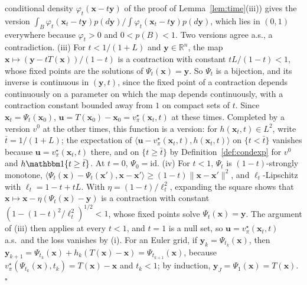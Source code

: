 \documentclass{article}
\newcommand{\RR}{\mathbb{R}}
\newcommand{\bx}{\mathbf{x}}
\newcommand{\by}{\mathbf{y}}
\newcommand{\bu}{\mathbf{u}}
\newcommand{\vstar}{v^{\star}}
\theoremstyle{plain}
\theoremstyle{remark}
\begin{document}
conditional density $\varphi_t(\bx-t\by)$ of the proof of Lemma~\ref{lem:time}(iii)) gives the version
$\int_B\varphi_t(\bx_t-t\by)p(d\by)/\int\varphi_t(\bx_t-t\by)p(d\by)$, which lies in $(0,1)$ everywhere because $\varphi_t>0$ and $0<p(B)<1$. Two versions
agree a.s., a contradiction.
(iii) For $t<1/(1+L)$ and $\by\in\RR^n$, the map $\bx\mapsto(\by-tT(\bx))/(1-t)$ is a contraction with constant $tL/(1-t)<1$, whose fixed
points are the solutions of $\Psi_t(\bx)=\by$. So $\Psi_t$ is a bijection, and its inverse is continuous in $(\by,t)$, since the fixed point of a
contraction depends continuously on a parameter on which the map depends continuously, with a contraction constant
bounded away from $1$ on compact sets of $t$. Since $\bx_t=\Psi_t(\bx_0)$, $\bu=T(\bx_0)-\bx_0=\vstar_\pi(\bx_t,t)$ at these times. Completed by a version
$v^0$ at the other times, this function is a version: for $h(\bx_t,t)\in L^2$, write $\bar t=1/(1+L)$; the expectation of
$\langle\bu-\vstar_\pi(\bx_t,t),h(\bx_t,t)\rangle$ on $\{t<\bar t\}$ vanishes because $\bu=\vstar_\pi(\bx_t,t)$ there, and on $\{t\ge\bar t\}$ by Definition~\ref{def:condexp}
for $v^0$ and $h\mathbbm 1\{t\ge\bar t\}$. At $t=0$, $\Psi_0=\mathrm{id}$.
(iv) For $t<1$, $\Psi_t$ is $(1-t)$-strongly monotone, $\langle\Psi_t(\bx)-\Psi_t(\bx'),\bx-\bx'\rangle\ge(1-t)\|\bx-\bx'\|^2$, and $\ell_t$-Lipschitz with
$\ell_t=1-t+tL$. With $\eta=(1-t)/\ell_t^2$, expanding the square shows that $\bx\mapsto\bx-\eta(\Psi_t(\bx)-\by)$ is a contraction with constant
$(1-(1-t)^2/\ell_t^2)^{1/2}<1$, whose fixed points solve $\Psi_t(\bx)=\by$. The argument of (iii) then applies at every $t<1$, and $t=1$ is a null
set, so $\bu=\vstar_\pi(\bx_t,t)$ a.s.\ and the loss vanishes by (i). For an Euler grid, if $\by_k=\Psi_{t_k}(\bx)$, then
$\by_{k+1}=\Psi_{t_k}(\bx)+h_k(T(\bx)-\bx)=\Psi_{t_{k+1}}(\bx)$, because $\vstar_\pi(\Psi_{t_k}(\bx),t_k)=T(\bx)-\bx$ and $t_k<1$; by induction, $\by_J=\Psi_1(\bx)=T(\bx)$.
\hfill$\square$
\end{document}
